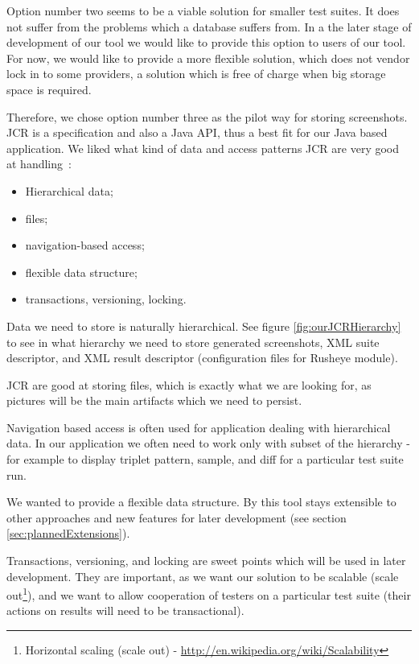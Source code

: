 \documentclass[11pt,oneside,final]{fithesis2}
\begin{document}
    Option number two seems to be a viable solution for smaller test suites. It does not suffer from the problems which a database suffers from.
    In a the later stage of development of our tool we would like to provide this option to users of our tool. For now, we would like to
    provide a more flexible solution, which does not vendor lock in to some providers, a solution which is free of charge when big storage
    space is required.
    
    Therefore, we chose option number three as the pilot way for storing screenshots. JCR is a specification and also a Java
    API, thus a best fit for our Java based application. We liked what kind of data and access
    patterns JCR are very good at handling~\citep{why_choose_repository}:
    
    \begin{itemize}
     \item Hierarchical data;
     \item files;
     \item navigation-based access;
     \item flexible data structure;
     \item transactions, versioning, locking.
    \end{itemize}
    
    Data we need to store is naturally hierarchical. See figure \ref{fig:ourJCRHierarchy} to 
    see in what hierarchy we need to store generated screenshots, XML suite descriptor, and XML result descriptor (configuration
    files for Rusheye module).
    
    JCR are good at storing files, which is exactly what we are looking for, as pictures will be the main artifacts which we need to
    persist.
    
    Navigation based access is often used for application dealing with hierarchical data. In our application we often need to work
    only with subset of the hierarchy - for example to display triplet pattern, sample, and diff for a particular test suite run.
    
    We wanted to provide a flexible data structure. By this tool stays extensible to other approaches and new features for later
    development (see section \ref{sec:plannedExtensions}).
    
    Transactions, versioning, and locking are sweet points which will be used in later development. They are important, as we want
    our solution to be scalable 
    (scale out\footnote{Horizontal scaling (scale out) - \url{http://en.wikipedia.org/wiki/Scalability}}),
    and we want to allow cooperation of testers on a particular test suite (their actions on results will need to be transactional).
    
\end{document}
